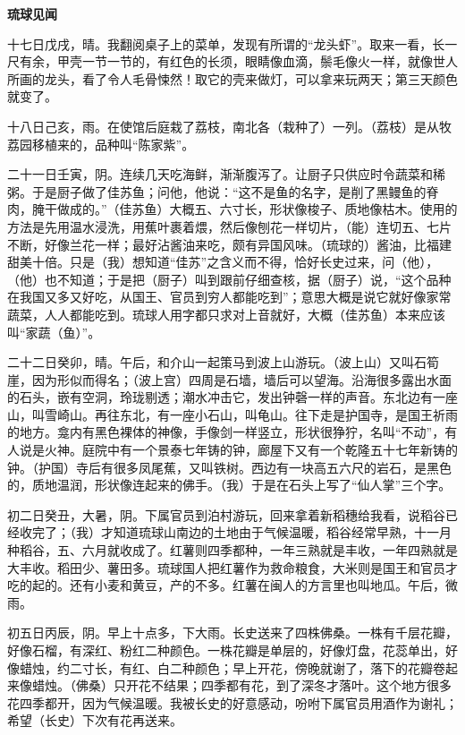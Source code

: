 \documentclass[12pt,UTF-8,openany]{ctexbook}
\begin{document}
\begin{normalsize}
    \begin{center}{\Large\textbf{琉球见闻}}\end{center}
    
    十七日戊戌，晴。我翻阅桌子上的菜单，发现有所谓的“龙头虾”。取来一看，长一尺有余，甲壳一节一节的，有红色的长须，眼睛像血滴，鬃毛像火一样，就像世人所画的龙头，看了令人毛骨悚然！取它的壳来做灯，可以拿来玩两天；第三天颜色就变了。
    
    十八日己亥，雨。在使馆后庭栽了荔枝，南北各（栽种了）一列。（荔枝）是从牧荔园移植来的，品种叫“陈家紫”。
    
    二十一日壬寅，阴。连续几天吃海鲜，渐渐腹泻了。让厨子只供应时令蔬菜和稀粥。于是厨子做了佳苏鱼；问他，他说：“这不是鱼的名字，是削了黑鳗鱼的脊肉，腌干做成的。”（佳苏鱼）大概五、六寸长，形状像梭子、质地像枯木。使用的方法是先用温水浸洗，用蕉叶裹着煨，然后像刨花一样切片，（能）连切五、七片不断，好像兰花一样；最好沾酱油来吃，颇有异国风味。（琉球的）酱油，比福建甜美十倍。只是（我）想知道“佳苏”之含义而不得，恰好长史过来，问（他），（他）也不知道；于是把（厨子）叫到跟前仔细查核，据（厨子）说，“这个品种在我国又多又好吃，从国王、官员到穷人都能吃到”；意思大概是说它就好像家常蔬菜，人人都能吃到。琉球人用字都只求对上音就好，大概（佳苏鱼）本来应该叫“家蔬（鱼）”。
    
    二十二日癸卯，晴。午后，和介山一起策马到波上山游玩。（波上山）又叫石筍崖，因为形似而得名；（波上宫）四周是石墙，墙后可以望海。沿海很多露出水面的石头，嵌有空洞，玲珑剔透；潮水冲击它，发出钟磬一样的声音。东北边有一座山，叫雪崎山。再往东北，有一座小石山，叫龟山。往下走是护国寺，是国王祈雨的地方。龛内有黑色裸体的神像，手像剑一样竖立，形状很狰狞，名叫“不动”，有人说是火神。庭院中有一个景泰七年铸的钟，廊屋下又有一个乾隆五十七年新铸的钟。（护国）寺后有很多凤尾蕉，又叫铁树。西边有一块高五六尺的岩石，是黑色的，质地温润，形状像连起来的佛手。（我）于是在石头上写了“仙人掌”三个字。
    
    初二日癸丑，大暑，阴。下属官员到泊村游玩，回来拿着新稻穗给我看，说稻谷已经收完了；（我）才知道琉球山南边的土地由于气候温暖，稻谷经常早熟，十一月种稻谷，五、六月就收成了。红薯则四季都种，一年三熟就是丰收，一年四熟就是大丰收。稻田少、薯田多。琉球国人把红薯作为救命粮食，大米则是国王和官员才吃的起的。还有小麦和黄豆，产的不多。红薯在闽人的方言里也叫地瓜。午后，微雨。
    
    初五日丙辰，阴。早上十点多，下大雨。长史送来了四株佛桑。一株有千层花瓣，好像石榴，有深红、粉红二种颜色。一株花瓣是单层的，好像灯盘，花蕊单出，好像蜡烛，约二寸长，有红、白二种颜色；早上开花，傍晚就谢了，落下的花瓣卷起来像蜡烛。（佛桑）只开花不结果；四季都有花，到了深冬才落叶。这个地方很多花四季都开，因为气候温暖。我被长史的好意感动，吩咐下属官员用酒作为谢礼；希望（长史）下次有花再送来。
    

\end{normalsize}
\end{document}
